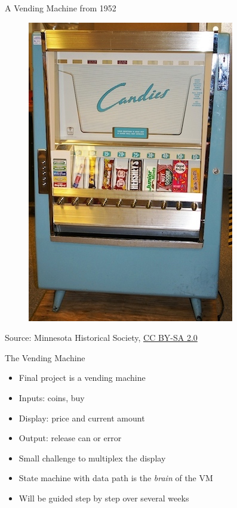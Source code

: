 \begin{frame}[fragile]{A Vending Machine from 1952}
\begin{figure}
    \centering
    \href{https://en.wikipedia.org/wiki/File:CandiesVendingMachine1952.jpg}{\includegraphics[scale=0.4]{CandiesVendingMachine1952}}

\end{figure}

{\tiny Source: Minnesota Historical Society, \href{https://creativecommons.org/licenses/by-sa/2.0}{CC BY-SA 2.0}}
\end{frame}

\begin{frame}[fragile]{The Vending Machine}
\begin{itemize}
\item Final project is a vending machine
\item Inputs: coins, buy
\item Display: price and current amount
\item Output: release can or error
\item Small challenge to multiplex the display
\item State machine with data path is the \emph{brain} of the VM
\item Will be guided step by step over several weeks
\end{itemize}
\end{frame}


